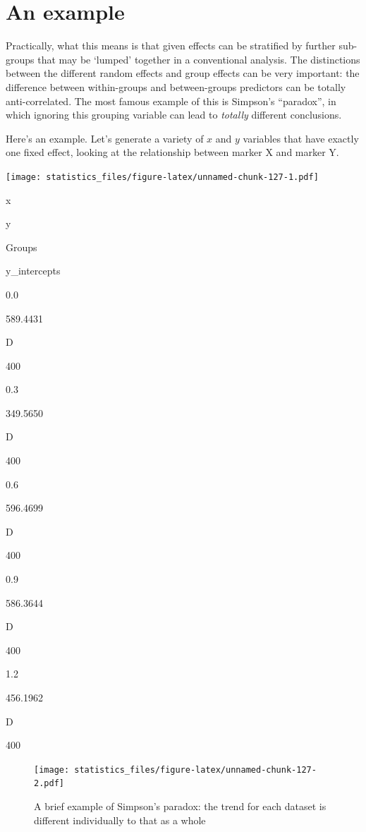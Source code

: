 \documentclass[]{book}
\begin{document}
\hypertarget{an-example}{%
\section{An example}\label{an-example}}

Practically, what this means is that given effects can be stratified by further sub-groups that may be `lumped' together in a conventional analysis. The distinctions between the different random effects and group effects can be very important: the difference between within-groups and between-groups predictors can be totally anti-correlated. The most famous example of this is Simpson's ``paradox'', in which ignoring this grouping variable can lead to \emph{totally} different conclusions.

Here's an example. Let's generate a variety of \(x\) and \(y\) variables that have exactly one fixed effect, looking at the relationship between marker X and marker Y.

\texttt{[image: statistics\_files/figure-latex/unnamed-chunk-127-1.pdf]}

x

y

Groups

y\_intercepts

0.0

589.4431

D

400

0.3

349.5650

D

400

0.6

596.4699

D

400

0.9

586.3644

D

400

1.2

456.1962

D

400

\begin{figure}
\centering
\texttt{[image: statistics\_files/figure-latex/unnamed-chunk-127-2.pdf]}
\caption{\label{fig:unnamed-chunk-1272}A brief example of Simpson's paradox: the trend for each dataset is different individually to that as a whole}
\end{figure}
\end{document}
